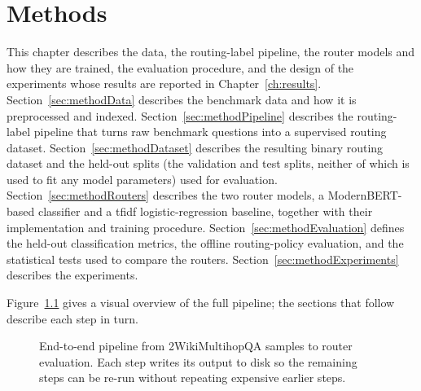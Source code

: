 \documentclass[english, bibtex]{kththesis}               %
\numberwithin{listing}{chapter}
\begin{document}
\cleardoublepage
\chapter{Methods}
\label{ch:methods}

This chapter describes the data, the routing-label pipeline, the router models and how they are trained, the evaluation procedure, and the design of the experiments whose results are reported in Chapter~\ref{ch:results}. Section~\ref{sec:methodData} describes the benchmark data and how it is preprocessed and indexed. Section~\ref{sec:methodPipeline} describes the routing-label pipeline that turns raw benchmark questions into a supervised routing dataset. Section~\ref{sec:methodDataset} describes the resulting binary routing dataset and the held-out splits (the validation and test splits, neither of which is used to fit any model parameters) used for evaluation. Section~\ref{sec:methodRouters} describes the two router models, a ModernBERT-based classifier and a \gls{tfidf} logistic-regression baseline, together with their implementation and training procedure. Section~\ref{sec:methodEvaluation} defines the held-out classification metrics, the offline routing-policy evaluation, and the statistical tests used to compare the routers. Section~\ref{sec:methodExperiments} describes the experiments.

Figure~\ref{fig:methodPipeline} gives a visual overview of the full pipeline; the sections that follow describe each step in turn.

\begin{figure}[!ht]
\centering
{}
\caption{End-to-end pipeline from 2WikiMultihopQA samples to router evaluation. Each step writes its output to disk so the remaining steps can be re-run without repeating expensive earlier steps.}
\label{fig:methodPipeline}
\end{figure}
\end{document}
